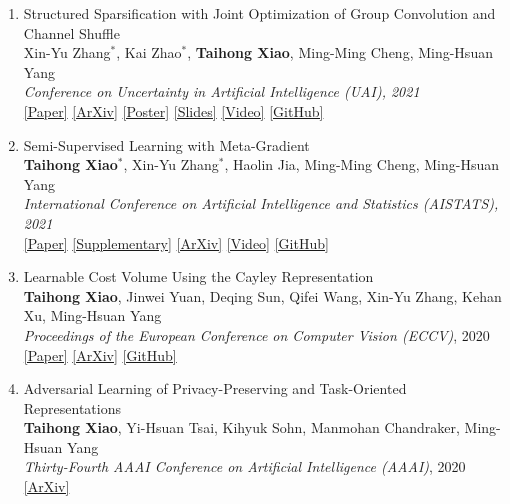 \documentclass[letterpaper]{article}
\begin{document}
\begin{enumerate}
\item Structured Sparsification with Joint Optimization of Group Convolution and Channel Shuffle \\
 	Xin-Yu Zhang$^*$, Kai Zhao$^*$, {\bf Taihong Xiao}, Ming-Ming Cheng, Ming-Hsuan Yang \\
 	{\it Conference on Uncertainty in Artificial Intelligence (UAI), 2021}\\
 	\href{https://www.auai.org/uai2021/pdf/uai2021.184.pdf}{[Paper]}
 	\href{https://arxiv.org/abs/2002.08127}{[ArXiv]}
 	\href{https://github.com/Sakura03/StrucSpars/raw/master/images/uai-poster.pdf}{[Poster]}
 	\href{https://github.com/Sakura03/StrucSpars/blob/master/images/full-slides.pdf}{[Slides]}
 	\href{https://underline.io/lecture/28845-184-ii-d1-structured-sparsification-with-joint-optimization-of-group-convolution-and-channel-shuffle}{[Video]}
 	\href{https://github.com/Sakura03/StrucSpars}{[GitHub]}
 	
\item Semi-Supervised Learning with Meta-Gradient \\
 	{\bf Taihong Xiao}$^*$, Xin-Yu Zhang$^*$, Haolin Jia, Ming-Ming Cheng, Ming-Hsuan Yang \\
 	{\it International Conference on Artificial Intelligence and Statistics (AISTATS), 2021}\\
 	\href{http://proceedings.mlr.press/v130/xiao21a/xiao21a.pdf}{[Paper]}
 	\href{http://proceedings.mlr.press/v130/xiao21a/xiao21a-supp.pdf}{[Supplementary]}
 	\href{https://arxiv.org/abs/2007.03966}{[ArXiv]}
 	\href{https://slideslive.com/38952927}{[Video]}
 	\href{https://github.com/Sakura03/SemiMeta}{[GitHub]}
 	
\item Learnable Cost Volume Using the Cayley Representation \\
	{\bf Taihong Xiao}, Jinwei Yuan, Deqing Sun, Qifei Wang, Xin-Yu Zhang, Kehan Xu,  Ming-Hsuan Yang\\
	{\it Proceedings of the European Conference on Computer Vision (ECCV)}, 2020 \\
	\href{https://www.ecva.net/papers/eccv_2020/papers_ECCV/papers/123540460.pdf}{[Paper]}
	\href{https://arxiv.org/abs/2007.11431}{[ArXiv]}
	\href{https://github.com/Prinsphield/LCV}{[GitHub]}

\item Adversarial Learning of Privacy-Preserving and Task-Oriented Representations\\
	{\bf Taihong Xiao}, Yi-Hsuan Tsai, Kihyuk Sohn, Manmohan Chandraker, Ming-Hsuan Yang\\
	{\it Thirty-Fourth AAAI Conference on Artificial Intelligence (AAAI)}, 2020\\
	\href{https://arxiv.org/abs/1911.10143}{[ArXiv]}


\end{enumerate}
\end{document}
